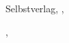
\begin{titlepage}
	\centering

	\vspace*{2cm}

	{\LARGE\bfseries\myTitle\par}
	\vspace{0.5cm}

	{\large\mySubtitle\par}
	\vspace{2cm}

	{\Large\myName\par}
	\vspace{1cm}

	\vfill

	{\large
		\if\myPublisher\@empty
			Selbstverlag, \myLocation, \myYear
		\else
			\myPublisher\par
			\vspace{0.5cm}
			\myLocation, \myYear
		\fi
	}

	\vspace{2cm}

\end{titlepage}
